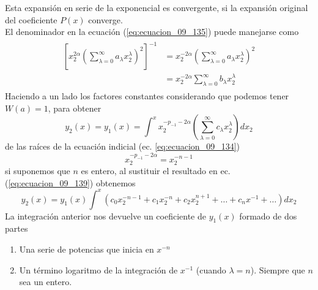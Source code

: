 Esta expansión en serie de la exponencial es convergente, si la expansión original del coeficiente $P(x)$ converge.
\\
El denominador en la ecuación (\ref{eq:ecuacion_09_135}) puede manejarse como
\begin{eqnarray}
\begin{aligned}
\left[ x_{2}^{2 \alpha} \left( \sum_{\lambda=0}^{\infty} a_{\lambda} x_{2}^{\lambda} \right)^{2} \right]^{-1} &= x_{2}^{-2 \alpha} \left( \sum_{\lambda=0}^{\infty} a_{\lambda} x_{2}^{\lambda} \right)^{2}  \\
&= x_{2}^{-2 \alpha} \sum_{\lambda=0}^{\infty} b_{\lambda} x_{2}^{\lambda}
\end{aligned}
\label{eq:ecuacion_09_138}
\end{eqnarray}
Haciendo a un lado los factores constantes considerando que podemos tener $W(a)=1$, para obtener
\begin{equation}
y_{2}(x) =  y_{1}(x) = \int^{x} x_{2}^{-p_{-1}-2 \alpha} \left( \sum_{\lambda=0}^{\infty} c_{\lambda} x_{2}^{\lambda} \right) dx_{2} 
\label{eq:ecuacion_09_139}
\end{equation}
de las raíces de la ecuación indicial (ec. \ref{eq:ecuacion_09_134})
\begin{equation}
x_{2}^{-p_{-1} - 2 \alpha} = x_{2}^{-n-1}
\end{equation}
si suponemos que $n$ es entero, al sustituir el resultado en ec. (\ref{eq:ecuacion_09_139}) obtenemos 
\begin{equation}
y_{2}(x) = y_{1}(x) \int^{x} (c_{0} x_{2}^{-n-1} + c_{1} x_{2}^{-n} + c_{2} x_{2}^{n+1} + \ldots + c_{n} x^{-1} + \ldots ) dx_{2}
\label{eq:ecuacion_09_141}
\end{equation}
La integración anterior nos devuelve un coeficiente de $y_{1}(x)$ formado de dos partes
\begin{enumerate}
\item Una serie de potencias que inicia en $x^{-n}$
\item Un término logaritmo de la integración de $x^{-1}$ (cuando $\lambda=n$). Siempre que $n$ sea un entero.
\end{enumerate}

